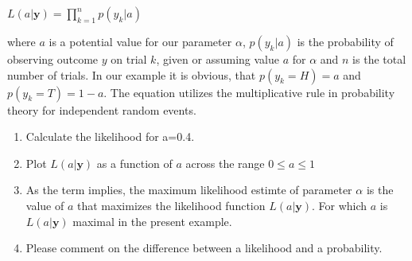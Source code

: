 \documentclass[12pt,english]{scrartcl}
\begin{document}
$\displaystyle L(a|\textbf{y}) = \prod_{k=1}^n p(y_k|a)$

where $a$ is a potential value for our parameter $\alpha$, $p(y_k|a)$ is the probability of observing outcome $y$ on trial $k$, given or assuming value $a$ for $\alpha$ and $n$ is the total number of trials. In our example it is obvious, that $p(y_k=H) = a$ and $p(y_k=T)=1-a$. The equation utilizes the multiplicative rule in probability theory for independent random events. 

\begin{enumerate}
 \item Calculate the likelihood for a=0.4.
 \item Plot $L(a|\textbf{y})$ as a function of $a$ across the range $0\leq a \leq 1$
 \item As the term implies, the maximum likelihood estimte of parameter $\alpha$ is the value of $a$ that maximizes the likelihood function $L(a|\textbf{y})$. For which $a$ is $L(a|\textbf{y})$ maximal in the present example.
 \item Please comment on the difference between a likelihood and a probability.   
\end{enumerate}


  
\end{document}
